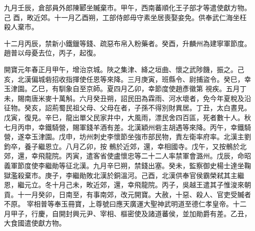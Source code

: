 \begin{pinyinscope}
 九月壬辰，倉部員外郎陳郾坐贓棄市。甲午，西南蕃順化王子部才等遣使獻方物。己
 酉，畋近郊。十一月乙酉朔，工部侍郎毋守素坐居喪娶妾免。供奉武仁海坐枉殺人棄市。



 十二月丙辰，禁新小鐵鑞等錢、疏惡布帛入粉藥者。癸酉，升麟州為建寧軍節度。趙普以母憂去位，丙子，起復。



 開寶元年春正月甲午，增治京城。陜之集津、絳之垣曲、懷之武陟饑，振之。己亥，北漢偏城砦招收指揮使任恩等來降。三月庚寅，班縣令、尉捕盜令。癸巳，幸玉津園。乙巳，有馴象自至京師。夏四月乙卯，幸節度使趙彥徽第
 視疾。五月丁未，賜南唐米麥十萬斛。六月癸丑朔，詔民田為霖雨、河水壞者，免今年夏稅及沿征物。癸亥，詔荊蜀民祖父母、父母在者，子孫不得別財異居。丁丑，太白晝見。戊寅，復見。辛巳，龍出單父民家井中，大風雨，漂民舍四百區，死者數十人。秋七月丙申，幸鐵騎營，賜軍錢羊酒有差。北漢穎州砦主胡遇等來降。丙午，幸鐵騎營，遂幸玉津園。戊申，坊州刺史李懷節坐強市部民物，責左衛率府率。北漢主劉鈞卒，養子繼恩立。八月乙卯，按
 鶻於近郊，還，幸相國寺。戊午，又按鶻於北郊，還，幸飛龍院。丙寅，遣客省使盧懷忠等二十二人率禁軍會潞州。戊辰，命昭義軍節度使李繼勛等征北漢。九月辛巳朔，禁錢出塞。癸未，監察御史楊士達坐鞠獄濫殺棄市。庚子，李繼勛敗北漢於銅溫河。己酉，北漢供奉官侯霸榮弒其主繼恩，繼元立。冬十月己未，畋近郊，還，幸飛龍院。丙子，吳越王遣其子惟浚來朝貢。十一月癸卯，日南至，有事南郊，改元開寶。大赦，十惡、殺人、官吏受贓者不原。
 宰相普等奉玉冊寶，上尊號曰應天廣運大聖神武明道至德仁孝皇帝。十二月甲子，行慶，自開封興元尹、宰相、樞密使及諸道蕃侯，並加勛爵有差。乙丑，大食國遣使獻方物。




\end{pinyinscope}
